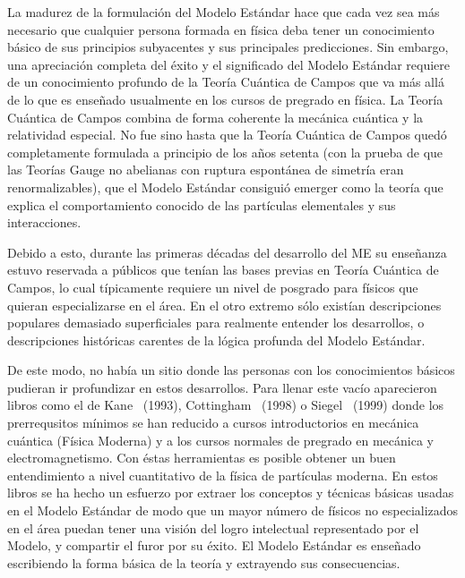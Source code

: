 La madurez de la formulación del Modelo Estándar hace que cada vez sea
más necesario que cualquier persona formada en física deba tener un
conocimiento básico de sus principios subyacentes y sus principales
predicciones. Sin embargo, una apreciación completa del éxito y el
significado del Modelo Estándar requiere de un conocimiento profundo
de la Teoría Cuántica de Campos que va más allá de lo que es
enseñado usualmente en los cursos de pregrado en física.
La Teoría
Cuántica de Campos combina de forma coherente la mecánica cuántica y
la relatividad especial.
%
No fue sino hasta que la Teoría Cuántica de
Campos quedó completamente formulada a principio de los años setenta
(con la prueba de que las Teorías Gauge no abelianas con ruptura
espontánea de simetría eran renormalizables), que el Modelo Estándar
consiguió emerger como la teoría que explica el comportamiento
conocido de las partículas elementales y sus interacciones.

Debido a esto, durante las primeras décadas del desarrollo del ME su
enseñanza estuvo reservada a públicos que tenían las bases previas en
Teoría Cuántica de Campos, lo cual típicamente requiere un nivel de
posgrado para físicos que quieran especializarse en el área. En el
otro extremo sólo existían descripciones populares demasiado
superficiales para realmente entender los desarrollos, o descripciones
históricas carentes de la lógica profunda del Modelo Estándar.

De este modo, no había un sitio donde las personas con los
conocimientos básicos pudieran ir profundizar en estos
desarrollos. Para llenar este vacío aparecieron libros como el de
Kane~\cite{kane} (1993), Cottingham~\cite{cottingham} (1998) o
Siegel~\cite{Siegel} (1999) donde los prerrequsitos mínimos se han reducido
a cursos introductorios en mecánica cuántica (Física Moderna) y a los cursos
normales de pregrado en mecánica y electromagnetismo. Con éstas
herramientas es posible obtener un buen entendimiento a nivel
cuantitativo de la física de partículas moderna. En estos libros se ha
hecho un esfuerzo por extraer los conceptos y técnicas básicas usadas
en el Modelo Estándar de modo que un mayor número de físicos no
especializados en el área puedan tener una visión del logro
intelectual representado por el Modelo, y compartir el furor
por su éxito. El Modelo Estándar es enseñado
escribiendo la forma básica de la teoría y extrayendo sus
consecuencias.

